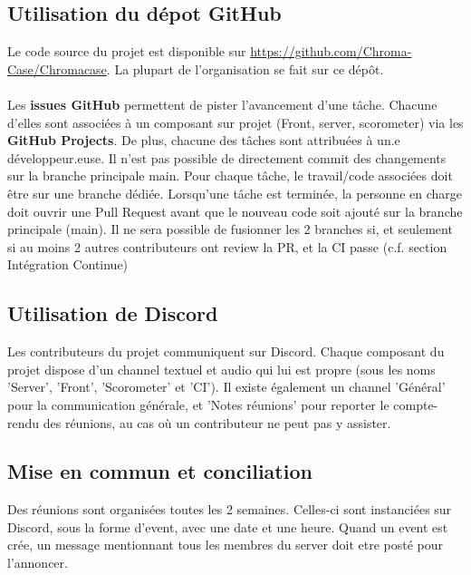 \subsection{Utilisation du dépot GitHub}
	Le code source du projet est disponible sur \url{https://github.com/Chroma-Case/Chromacase}.
	La plupart de l’organisation se fait sur ce dépôt.
	\\\\
	Les \textbf{issues GitHub} permettent de pister l’avancement d’une tâche. Chacune d’elles sont associées à un composant sur projet (Front, server, scorometer) via les \textbf{GitHub Projects}. De plus, chacune des tâches sont attribuées à un.e développeur.euse.
	Il n’est pas possible de directement commit des changements sur la branche principale main. Pour chaque tâche, le travail/code associées doit être sur une branche dédiée.
	Lorsqu’une tâche est terminée, la personne en charge doit ouvrir une Pull Request avant que le nouveau code soit ajouté sur la branche principale (main). Il ne sera possible de fusionner les 2 branches si, et seulement si au moins 2 autres contributeurs ont review la PR, et la CI passe (c.f. section Intégration Continue)

\subsection{Utilisation de Discord}
	Les contributeurs du projet communiquent sur Discord. Chaque composant du projet dispose d’un channel textuel et audio qui lui est propre (sous les noms 'Server', 'Front', 'Scorometer' et 'CI'). Il existe également un channel 'Général' pour la communication générale, et 'Notes réunions' pour reporter le compte-rendu des réunions, au cas où un contributeur ne peut pas y assister.

\subsection{Mise en commun et conciliation}
	Des réunions sont organisées toutes les 2 semaines. Celles-ci sont instanciées sur Discord, sous la forme d'event, avec une date et une heure. Quand un event est crée, un message mentionnant tous les membres du server doit etre posté pour l'annoncer.

